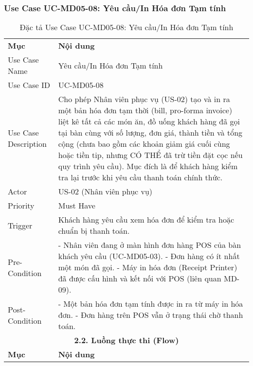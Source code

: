 
\subsubsection{Use Case UC-MD05-08: Yêu cầu/In Hóa đơn Tạm tính}

\begin{longtable}{|m{4cm}|p{11cm}|}
\caption{Đặc tả Use Case UC-MD05-08: Yêu cầu/In Hóa đơn Tạm tính} \label{tab:uc_md05_08} \\
\hline

\endhead %
\hline
\endfoot %
\hline
\endlastfoot %
\multicolumn{2}{|c|}{\textbf{2.1. Tóm tắt (Summary)}} \\
\hline
\textbf{Mục} & \textbf{Nội dung} \\
\hline
Use Case Name & Yêu cầu/In Hóa đơn Tạm tính \\
\hline
Use Case ID & UC-MD05-08 \\
\hline
Use Case Description & Cho phép Nhân viên phục vụ (US-02) tạo và in ra một bản hóa đơn tạm thời (bill, pro-forma invoice) liệt kê tất cả các món ăn, đồ uống khách hàng đã gọi tại bàn cùng với số lượng, đơn giá, thành tiền và tổng cộng (chưa bao gồm các khoản giảm giá cuối cùng hoặc tiền tip, nhưng CÓ THỂ đã trừ tiền đặt cọc nếu quy trình yêu cầu). Mục đích là để khách hàng kiểm tra lại trước khi yêu cầu thanh toán chính thức. \\
\hline
Actor & US-02 (Nhân viên phục vụ) \\
\hline
Priority & Must Have \\
\hline
Trigger & Khách hàng yêu cầu xem hóa đơn để kiểm tra hoặc chuẩn bị thanh toán. \\
\hline
Pre-Condition & - Nhân viên đang ở màn hình đơn hàng POS của bàn khách yêu cầu (UC-MD05-03). \newline - Đơn hàng có ít nhất một món đã gọi. \newline - Máy in hóa đơn (Receipt Printer) đã được cấu hình và kết nối với POS (liên quan MD-09). \\
\hline
Post-Condition & - Một bản hóa đơn tạm tính được in ra từ máy in hóa đơn. \newline - Đơn hàng trên POS vẫn ở trạng thái chờ thanh toán. \\
\hline
\multicolumn{2}{|c|}{\textbf{2.2. Luồng thực thi (Flow)}} \\
\hline
\textbf{Mục} & \textbf{Nội dung} \\

\end{longtable}
